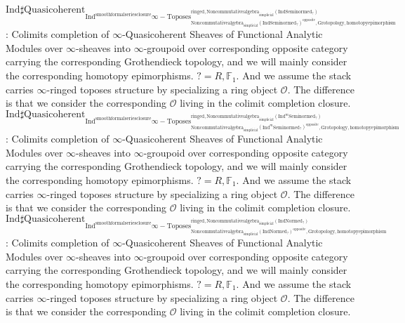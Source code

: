 \documentclass[11pt]{book}
\theoremstyle{definition}
\numberwithin{equation}{section}
\begin{document}
 
 \noindent $\mathrm{Ind}\mathrm{\sharp Quasicoherent}_{\mathrm{Ind}^\text{smoothformalseriesclosure}\infty-\mathrm{Toposes}^{\mathrm{ringed},\mathrm{Noncommutativealgebra}_{\mathrm{simplicial}}(\mathrm{Ind}\mathrm{Seminormed}_?)}_{\mathrm{Noncommutativealgebra}_{\mathrm{simplicial}}(\mathrm{Ind}\mathrm{Seminormed}_?)^\mathrm{opposite},\mathrm{Grotopology,homotopyepimorphism}}}$: Colimits completion of $\infty$-Quasicoherent Sheaves of Functional Analytic Modules over $\infty$-sheaves into $\infty$-groupoid over corresponding opposite category carrying the corresponding Grothendieck topology, and we will mainly consider the corresponding homotopy epimorphisms. $?=R,\mathbb{F}_1$. And we assume the stack carries $\infty$-ringed toposes structure by specializing a ring object $\mathcal{O}$. The difference is that we consider the corresponding $\mathcal{O}$ living in the colimit completion closure. \\
\noindent $\mathrm{Ind}\mathrm{\sharp Quasicoherent}_{\mathrm{Ind}^\text{smoothformalseriesclosure}\infty-\mathrm{Toposes}^{\mathrm{ringed},\mathrm{Noncommutativealgebra}_{\mathrm{simplicial}}(\mathrm{Ind}^m\mathrm{Seminormed}_?)}_{\mathrm{Noncommutativealgebra}_{\mathrm{simplicial}}(\mathrm{Ind}^m\mathrm{Seminormed}_?)^\mathrm{opposite},\mathrm{Grotopology,homotopyepimorphism}}}$: Colimits completion of $\infty$-Quasicoherent Sheaves of Functional Analytic Modules over $\infty$-sheaves into $\infty$-groupoid over corresponding opposite category carrying the corresponding Grothendieck topology, and we will mainly consider the corresponding homotopy epimorphisms. $?=R,\mathbb{F}_1$. And we assume the stack carries $\infty$-ringed toposes structure by specializing a ring object $\mathcal{O}$. The difference is that we consider the corresponding $\mathcal{O}$ living in the colimit completion closure.\\
\noindent $\mathrm{Ind}\mathrm{\sharp Quasicoherent}_{\mathrm{Ind}^\text{smoothformalseriesclosure}\infty-\mathrm{Toposes}^{\mathrm{ringed},\mathrm{Noncommutativealgebra}_{\mathrm{simplicial}}(\mathrm{Ind}\mathrm{Normed}_?)}_{\mathrm{Noncommutativealgebra}_{\mathrm{simplicial}}(\mathrm{Ind}\mathrm{Normed}_?)^\mathrm{opposite},\mathrm{Grotopology,homotopyepimorphism}}}$: Colimits completion of $\infty$-Quasicoherent Sheaves of Functional Analytic Modules over $\infty$-sheaves into $\infty$-groupoid over corresponding opposite category carrying the corresponding Grothendieck topology, and we will mainly consider the corresponding homotopy epimorphisms. $?=R,\mathbb{F}_1$. And we assume the stack carries $\infty$-ringed toposes structure by specializing a ring object $\mathcal{O}$. The difference is that we consider the corresponding $\mathcal{O}$ living in the colimit completion closure.\\
\end{document}
